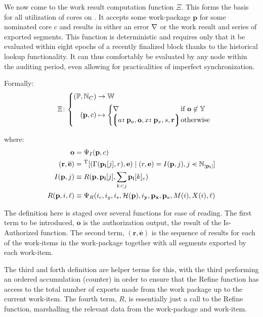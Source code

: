 We now come to the work result computation function $\Xi$. This forms the basis for all utilization of cores on \Jam. It accepts some work-package $\mathbf{p}$ for some nominated core $c$ and results in either an error $\nabla$ or the work result and series of exported segments. This function is deterministic and requires only that it be evaluated within eight epochs of a recently finalized block thanks to the historical lookup functionality. It can thus comfortably be evaluated by any node within the auditing period, even allowing for practicalities of imperfect synchronization.

Formally:
\begin{equation}\label{eq:workresultfunction}
  \!\!\Xi \colon \left\{\begin{aligned}
    (\mathbb{P}, \N_C) &\to \mathbb{W} \\
    (\mathbf{p}, c) &\mapsto \begin{cases}
        \error &\when \mathbf{o} \not\in \Y \\
        \tup{\is{a}{\mathbf{p}_a}, \mathbf{o}, \is{x}{\mathbf{p}_x}, s, \mathbf{r}} \!\!\!\!\!&\otherwise
    \end{cases}
  \end{aligned}\right.\!\!\!\!\!\!\!
\end{equation}

where:
\begin{align*}
  \mathbf{o} &= \Psi_I(\mathbf{p}, c) \\
  (\mathbf{r}, \overline{\mathbf{e}}) &= \transpose[(\Gamma(\mathbf{p}_\mathbf{i}[j], r), \mathbf{e}) \mid (r, \mathbf{e}) = I(\mathbf{p}, j), j \orderedin \N_{|\mathbf{p}_\mathbf{i}|}] \\
  I(\mathbf{p}, j) &\equiv R(\mathbf{p}, \mathbf{p}_\mathbf{i}[j], \sum_{k < j}\mathbf{p}_\mathbf{i}[k]_e)\\
  R(\mathbf{p}, i, \ell) &\equiv \Psi_R(i_c, i_g, i_s, \mathcal{H}(\mathbf{p}), i_\mathbf{y}, \mathbf{p}_\Tcontext, \mathbf{p}_a, M(i), X(i), \ell)
\end{align*}

The definition here is staged over several functions for ease of reading. The first term to be introduced, $\mathbf{o}$ is the authorization output, the result of the Is-Authorized function. The second term, $(\mathbf{r}, \overline{\mathbf{e}})$ is the sequence of results for each of the work-items in the work-package together with all segments exported by each work-item.

The third and forth definition are helper terms for this, with the third performing an ordered accumulation (\ie counter) in order to ensure that the Refine function has access to the total number of exports made from the work package up to the current work-item. The fourth term, $R$, is essentially just a call to the Refine function, marshalling the relevant data from the work-package and work-item.

